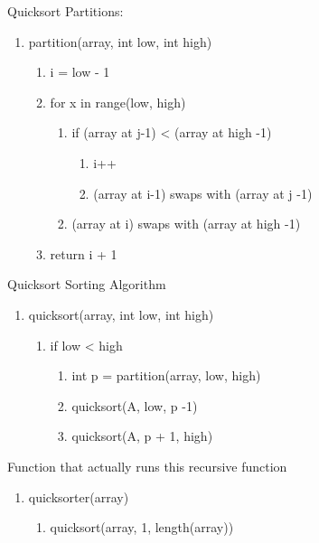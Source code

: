 \documentclass[11pt]{article}
\begin{document}
Quicksort
Partitions:
\begin{enumerate}
\item partition(array, int low, int high)
	\begin{enumerate}
	\item i = low - 1
	\item for x in range(low, high)
		\begin{enumerate}
		\item if (array at j-1) < (array at high -1)
			\begin{enumerate}
			\item i++
			\item (array at i-1) swaps with (array at j -1)
			\end{enumerate}
		\item (array at i) swaps with (array at high -1)
		\end{enumerate}
	\item return i + 1
	\end{enumerate}
\end{enumerate}

Quicksort Sorting Algorithm
\begin{enumerate}
\item quicksort(array, int low, int high)
	\begin{enumerate}
	\item if low < high
		\begin{enumerate}
		\item int p = partition(array, low, high)
		\item quicksort(A, low, p -1)
		\item quicksort(A, p + 1, high)
		\end{enumerate}
	\end{enumerate}
\end{enumerate}
Function that actually runs this recursive function
\begin{enumerate}
\item quicksorter(array)
	\begin{enumerate}
	\item quicksort(array, 1, length(array))
	\end{enumerate}
\end{enumerate}
\end{document}
